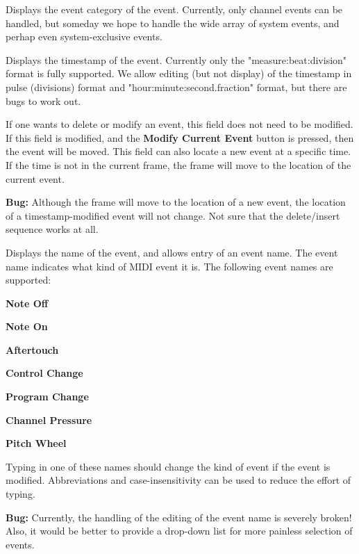    Displays the event category of the event.  Currently, only channel events
   can be handled, but someday we hope to handle the wide array of system
   events, and perhap even system-exclusive events.

   Displays the timestamp of the event.  Currently only the
   "measure:beat:division" format is fully supported.
   We allow editing (but not display) of the timestamp in
   pulse (divisions) format and "hour:minute:second.fraction" format, but
   there are bugs to work out.

   If one wants to delete or modify an event, this field does not need to be
   modified.  If this field is modified, and the \textbf{Modify Current Event}
   button is pressed, then the event will be moved.  This field can also locate
   a new event at a specific time.  If the time is not in the current frame,
   the frame will move to the location of the current event.

   \textbf{Bug:}
   Although the frame will move to the location of a new event, the location of
   a timestamp-modified event will not change.  Not sure that the delete/insert
   sequence works at all.

   Displays the name of the event, and allows entry of an event name.
   The event name indicates what kind of MIDI event it is. 
   The following event names are supported:

   \begin{enumber}
      \item \textbf{Note Off}
      \item \textbf{Note On}
      \item \textbf{Aftertouch}
      \item \textbf{Control Change}
      \item \textbf{Program Change}
      \item \textbf{Channel Pressure}
      \item \textbf{Pitch Wheel}
   \end{enumber}

   Typing in one of these names should change the kind of event if the event is
   modified.  Abbreviations and case-insensitivity can be used to reduce the
   effort of typing.

   \textbf{Bug:}
   Currently, the handling of the editing of the event name is severely broken!
   Also, it would be better to provide a drop-down list for more painless
   selection of events.

